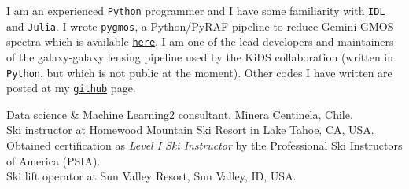 \documentclass[11pt]{article}
\begin{document}
\pagebreak



\noindent
I am an experienced \texttt{Python} programmer and I have some familiarity with
\texttt{IDL} and \texttt{Julia}. I wrote {\tt pygmos}, a Python/PyRAF pipeline to reduce 
Gemini-GMOS spectra which is available 
\href{https://github.com/cristobal-sifon/pygmos/}{\texttt{here}}. 
I am one of the lead 
developers and maintainers of the galaxy-galaxy lensing pipeline used by the 
KiDS collaboration (written in \texttt{Python}, but which is not public at the 
moment). Other codes I have written are posted at my 
\href{https://github.com/cristobal-sifon}{\texttt{github}} page.\\


\hline



\noindent
{} Data science \& Machine Learning2 consultant, Minera Centinela, Chile.\\
 Ski instructor at Homewood Mountain Ski Resort in Lake 
Tahoe, CA, USA. Obtained certification as \emph{Level I Ski Instructor} by the 
Professional Ski Instructors of America (PSIA).\\
 Ski lift operator at Sun Valley Resort, Sun Valley, ID, USA.\\


\end{document}
